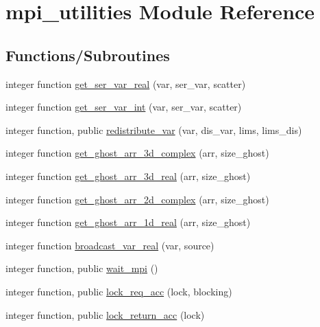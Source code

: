 \hypertarget{namespacempi__utilities}{}\section{mpi\+\_\+utilities Module Reference}
\label{namespacempi__utilities}
\subsection*{Functions/\+Subroutines}
\begin{DoxyCompactItemize}
\item 
integer function \hyperlink{namespacempi__utilities_a4ecf85687516f8d8d942afe05652d963}{get\+\_\+ser\+\_\+var\+\_\+real} (var, ser\+\_\+var, scatter)
\item 
integer function \hyperlink{namespacempi__utilities_ac8eaaa2c9c0901f0e4ea4679986e8c7d}{get\+\_\+ser\+\_\+var\+\_\+int} (var, ser\+\_\+var, scatter)
\item 
integer function, public \hyperlink{namespacempi__utilities_a128702990bd5fddc582e8fabcffc82b2}{redistribute\+\_\+var} (var, dis\+\_\+var, lims, lims\+\_\+dis)
\item 
integer function \hyperlink{namespacempi__utilities_a2212e8eedabb82df5c9d430fce6a0010}{get\+\_\+ghost\+\_\+arr\+\_\+3d\+\_\+complex} (arr, size\+\_\+ghost)
\item 
integer function \hyperlink{namespacempi__utilities_a01b9221fa05f573cb74027343aa8ff6b}{get\+\_\+ghost\+\_\+arr\+\_\+3d\+\_\+real} (arr, size\+\_\+ghost)
\item 
integer function \hyperlink{namespacempi__utilities_a84112225ce7bf0b3f893b23512be58df}{get\+\_\+ghost\+\_\+arr\+\_\+2d\+\_\+complex} (arr, size\+\_\+ghost)
\item 
integer function \hyperlink{namespacempi__utilities_a298564f1d8c0e8720419a10dca24587a}{get\+\_\+ghost\+\_\+arr\+\_\+1d\+\_\+real} (arr, size\+\_\+ghost)
\item 
integer function \hyperlink{namespacempi__utilities_a7a7d740f6e847cd65e21b4f5d85a0ca7}{broadcast\+\_\+var\+\_\+real} (var, source)
\item 
integer function, public \hyperlink{namespacempi__utilities_a790ea24d32dd0e249541c1e57cd85536}{wait\+\_\+mpi} ()
\item 
integer function, public \hyperlink{namespacempi__utilities_a5a789d05be41d6109c01f46cc98620c8}{lock\+\_\+req\+\_\+acc} (lock, blocking)
\item 
integer function, public \hyperlink{namespacempi__utilities_a86f9982a0f92b51a916f832d9a3d8ba9}{lock\+\_\+return\+\_\+acc} (lock)

\end{DoxyCompactItemize}
